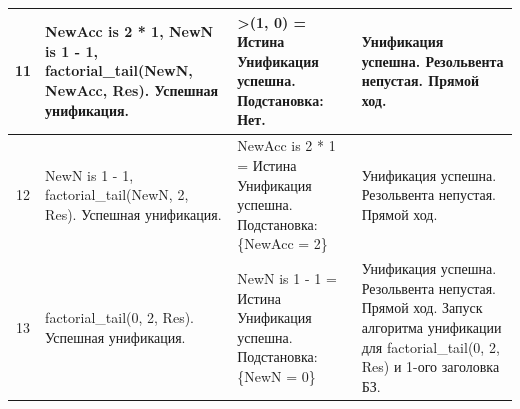 \begin{tabularx}{\textwidth}{|c|>{\small}X|>{\small}X|>{\small}X|}
	11                                                                                 &
	NewAcc is 2 * 1, \newline
	NewN is 1 - 1, \newline
	factorial\_tail(NewN, NewAcc, Res). \newline
	Успешная унификация.                                                               &
	>(1, 0) = \newline
	Истина \newline
	Унификация успешна. \newline
	Подстановка: \newline
	Нет.                                                                               &
	Унификация успешна. \newline
	Резольвента непустая. \newline
	Прямой ход.                                                                                \\
	\hline

	12                                                                                 &
	NewN is 1 - 1, \newline
	factorial\_tail(NewN, 2, Res). \newline
	Успешная унификация.                                                               &
	NewAcc is 2 * 1 = \newline
	Истина \newline
	Унификация успешна. \newline
	Подстановка: \newline
	\{NewAcc = 2\}                                                                     &
	Унификация успешна. \newline
	Резольвента непустая. \newline
	Прямой ход.                                                                                \\
	\hline

	13                                                                                 &
	factorial\_tail(0, 2, Res). \newline
	Успешная унификация.                                                               &
	NewN is 1 - 1 = \newline
	Истина \newline
	Унификация успешна. \newline
	Подстановка: \newline
	\{NewN = 0\}                                                                       &
	Унификация успешна. \newline
	Резольвента непустая. \newline
	Прямой ход. \newline
	Запуск алгоритма унификации для factorial\_tail(0, 2, Res) и 1-ого заголовка БЗ.           \\
	\hline


\end{tabularx}
